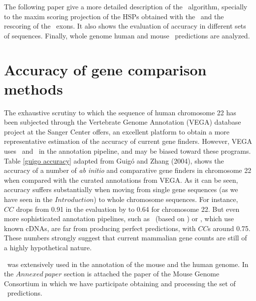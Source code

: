 The following paper give a more detailed description of the \sgp\
algorithm, specially to the maxim scoring projection of the HSPs
obtained with the \tbx\ and the rescoring of the \geneid\ exons.  It
also shows the evaluation of accuracy in different sets of sequences.
Finally, whole genome human and mouse \sgp\ predictions are analyzed.




\section{Accuracy of gene comparison methods}

The exhaustive scrutiny to which the sequence of human chromosome 22
\citep{dunham:1999a} has been subjected through the Vertebrate Genome
Annotation (VEGA) database project at the Sanger Center offers, an
excellent platform to obtain a more representative estimation of the
accuracy of current gene finders. However, VEGA uses \genscan\ and
\fgenes\ in the annotation pipeline, and may be biased toward these
programs. Table \ref{guigo accuracy} adapted from Guig\'o and Zhang
(2004), shows the accuracy of a number of \textit{ab initio} and
comparative gene finders in chromosome 22 when compared with the
curated annotations from VEGA. As it can be seen, accuracy suffers
substantially when moving from single gene sequences (as we have seen
in the $Introduction$) to whole chromosome sequences. For instance,
\genscan\ $CC$ drops from 0.91 in the evaluation by \cite{rogic:2001a} to
0.64 for chromosome 22. But even more sophisticated annotation
pipelines, such as \ensembl\ (based on \genewise) or \fgenes, which
use known cDNAs, are far from producing perfect predictions, with
$CC$s around 0.75. These numbers strongly suggest that current
mammalian gene counts are still of a highly hypothetical nature.


\sgp\ was extensively used in the annotation of the mouse and the human
genome. In the $Annexed\ paper$ section is attached the paper of the
Mouse Genome Consortium in which we have participate obtaining and
processing the set of \sgp\ predictions.
\vspace{2cm}




